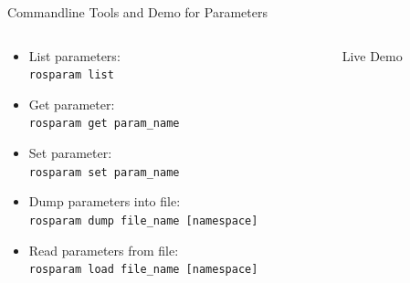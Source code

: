 \documentclass[aspectratio=43]{beamer}
\newcommand{\inline}[1]{\texttt{#1}}
\begin{document}
\begin{frame}{Commandline Tools and Demo for Parameters}
	\begin{columns}
		\begin{column}{0.5\textwidth}
			\begin{itemize}
				\item List parameters:\\\inline{rosparam list}
				\item Get parameter:\\\inline{rosparam get param_name}
				\item Set parameter:\\\inline{rosparam set param_name}
				\item Dump parameters into file:\\\inline{rosparam dump file_name [namespace]}
				\item Read parameters from file:\\\inline{rosparam load file_name [namespace]}
			\end{itemize}
		\end{column}
		\begin{column}{0.5\textwidth}
			\centering
      Live Demo
		\end{column}
	\end{columns}
\end{frame}

\end{document}
